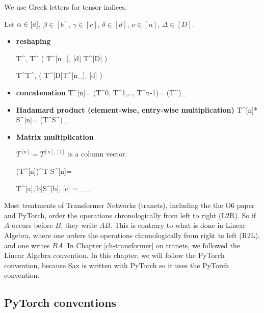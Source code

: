 We use  
Greek letters for 
tensor indices.

Let $\alpha\in[a]$, $\beta\in[b]$, $\gamma\in[c]$,
$\delta \in[d]$,
$\nu\in[n]$, $\Delta\in[D]$.


\begin{itemize}

\item{\bf reshaping}

\beq
T^{\nu, \delta}\rarrow T^{\Delta}
\;\;
\left(
T^{[n_\rvh], [d]} \rarrow T^{[D]}
\right)
\eeq

\beq
T^{\Delta}\rarrow T^{\nu, \delta}
\;\;
\left(
T^{[D]}\rarrow T^{[n_\rvh], [d]}
\right)
\eeq

\item {\bf concatenation}
\beq
T^{[n]}= (T^0, T^1,\ldots, T^{n-1})=
(T^\nu)_{\nu\in[n]}
\eeq

\item {\bf Hadamard product (element-wise, entry-wise multiplication)}
\beq
T^{[n]}* S^{[n]}= (T^\nu S^\nu)_{\nu\in[n]}
\eeq


\item {\bf Matrix multiplication}

$T^{[n]}= T^{[n], [1]}$ is a column vector.

\beq
(T^{[n]})^T S^{[n]}=
\eeq

\beq
T^{[a],[b]}S^{[b], [c]}
=
_{\alp_\in [a], \gamma \in [c]}
\eeq

\end{itemize}

Most treatments of Transformer Networks (tranets), including the
the O6 paper and PyTorch,  order the
operations chronologically from
left to right (L2R). So if $A$ occurs before $B$,
they write $AB$.
This is contrary
to what is done in Linear Algebra, where one
orders the operations chronologically from right to left (R2L), and one writes $BA$.
In Chapter \ref{ch-transformer}
on tranets,
we followed the Linear Algebra
convention.
In this chapter,
we will
follow the PyTorch
convention,
because Sax is written with 
PyTorch
so it uses the PyTorch convention.


\subsection{PyTorch conventions}




